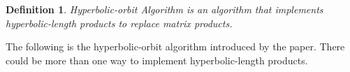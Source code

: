 \documentclass{article}
\theoremstyle{plain}
\theoremstyle{plain} %
\newtheorem{definition}[theorem]{Definition}
\theoremstyle{definition}  %
\theoremstyle{remark}  %
\theoremstyle{plain}
\begin{document}
\begin{definition}
Hyperbolic-orbit Algorithm is an algorithm that implements hyperbolic-length products to replace matrix products.
\end{definition}
The following is the hyperbolic-orbit algorithm introduced by the paper. There could be more than one way to implement hyperbolic-length products.
\begin{itemize}






\end{itemize}
\end{document}
